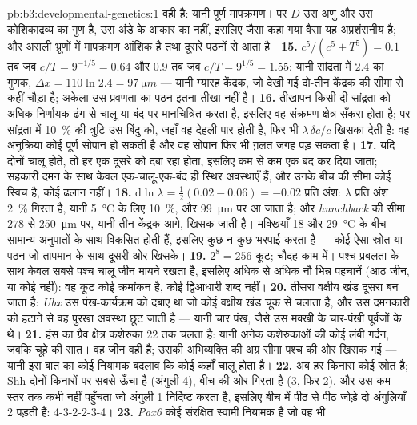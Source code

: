\begin{solution}{pb:b3:developmental-genetics:1}
वही है: यानी पूर्ण मापक्रमण। पर $D$ उस अणु और उस कोशिकाद्रव्य का गुण
है, उस अंडे के आकार का नहीं, इसलिए जैसा कहा गया वैसा यह अप्रशंसनीय है;
और असली भ्रूणों में मापक्रमण आंशिक है तथा दूसरे पठनों से आता है।
\textbf{15.} $c^{5}/(c^{5} + T^{5}) = 0.1$ तब जब $c/T = 9^{-1/5} = 0.64$
और $0.9$ तब जब $c/T = 9^{1/5} = 1.55$: यानी सांद्रता में $2.4$ का गुणक,
$\Delta x = 110\ln 2.4 = \qty{97}{\micro m}$ --- यानी ग्यारह केंद्रक,
जो देखी गई दो-तीन केंद्रक की सीमा से कहीं चौड़ा है; अकेला उस प्रवणता का
पठन इतना तीखा नहीं है।
\textbf{16.} तीखापन किसी दी सांद्रता को अधिक निर्णायक ढंग से चालू या
बंद पर मानचित्रित करता है, इसलिए वह संक्रमण-क्षेत्र सँकरा होता है; पर
सांद्रता में \qty{10}{\%} की त्रुटि उस बिंदु को, जहाँ वह देहली पार होती
है, फिर भी $\lambda\,\delta c/c$ खिसका देती है: वह अनुक्रिया कोई पूर्ण
सोपान हो सकती है और वह सोपान फिर भी ग़लत जगह पड़ सकता है।
\textbf{17.} यदि दोनों चालू होते, तो हर एक दूसरे को दबा रहा होता,
इसलिए कम से कम एक बंद कर दिया जाता; सहकारी दमन के साथ केवल
एक-चालू-एक-बंद ही स्थिर अवस्थाएँ हैं, और उनके बीच की सीमा कोई स्विच है,
कोई ढलान नहीं।
\textbf{18.} $\mathrm{d}\ln\lambda = \tfrac{1}{2}(0.02 - 0.06) = -0.02$
प्रति अंश: $\lambda$ प्रति अंश \qty{2}{\%} गिरता है, यानी
\qty{5}{\celsius} के लिए \qty{10}{\%}, और \qty{99}{\micro m} पर आ जाता
है; और \emph{hunchback} की सीमा $278$ से \qty{250}{\micro m} पर, यानी
तीन केंद्रक आगे, खिसक जाती है। मक्खियाँ \qty{18}{} और
\qty{29}{\celsius} के बीच सामान्य अनुपातों के साथ विकसित होती हैं,
इसलिए कुछ न कुछ भरपाई करता है --- कोई ऐसा स्रोत या पठन जो तापमान के
साथ दूसरी ओर खिसके।
\textbf{19.} $2^{8} = 256$ कूट; चौदह काम में। पश्च प्रबलता के साथ केवल
सबसे पश्च चालू जीन मायने रखता है, इसलिए अधिक से अधिक नौ भिन्न पहचानें
(आठ जीन, या कोई नहीं): वह कूट कोई क्रमांकन है, कोई द्विआधारी शब्द नहीं।
\textbf{20.} तीसरा वक्षीय खंड दूसरा बन जाता है: \emph{Ubx} उस
पंख-कार्यक्रम को दबाए था जो कोई वक्षीय खंड चूक से चलाता है, और उस
दमनकारी को हटाने से वह पुरखा अवस्था छूट जाती है --- यानी चार पंख, जैसे
उस मक्खी के चार-पंखी पूर्वजों के थे।
\textbf{21.} हंस का ग्रैव क्षेत्र कशेरुका 22 तक चलता है: यानी अनेक
कशेरुकाओं की कोई लंबी गर्दन, जबकि चूहे की सात। वह जीन वही है; उसकी
अभिव्यक्ति की अग्र सीमा पश्च की ओर खिसक गई --- यानी इस बात का कोई
नियामक बदलाव कि कोई  कहाँ चालू होता है।
\textbf{22.} अब हर किनारा कोई स्रोत है; Shh दोनों किनारों पर सबसे ऊँचा
है (अंगुली 4), बीच की ओर गिरता है (3, फिर 2), और उस कम स्तर तक कभी
नहीं पहुँचता जो अंगुली 1 निर्दिष्ट करता है, इसलिए बीच में पीठ से पीठ
जोड़े दो अंगुलियाँ 2 पड़ती हैं: 4-3-2-2-3-4।
\textbf{23.} \emph{Pax6} कोई संरक्षित स्वामी नियामक है जो वह भी

\end{solution}
